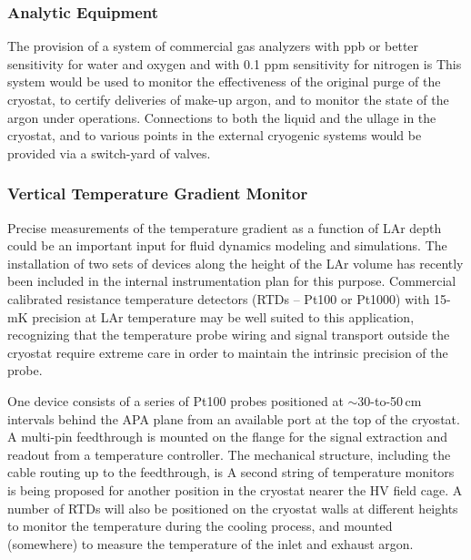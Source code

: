 \subsubsection{Analytic Equipment}

The provision of a system of commercial gas analyzers with ppb or better sensitivity for water and oxygen and with 0.1 ppm sensitivity for nitrogen is This system would be used to monitor the effectiveness of the original purge of the cryostat, to certify deliveries of make-up argon, and to monitor the state of the argon under operations. Connections to both the liquid and the ullage in the cryostat, and to various points in the external cryogenic systems would be provided via a switch-yard of valves. 

\subsubsection{Vertical Temperature Gradient Monitor}

	Precise measurements of the temperature gradient as a function of LAr depth could be
	an important input for fluid dynamics modeling and simulations. The installation of two sets of devices along the  height of the LAr volume 
	has recently  been included in the internal instrumentation plan  for this purpose.
	Commercial calibrated resistance temperature detectors (RTDs -- Pt100 or Pt1000) with 15-mK precision at LAr temperature may be well suited to this application, recognizing that the temperature probe wiring and signal transport outside the cryostat require extreme care in order to maintain  the intrinsic precision of the probe.
	
One device consists of a series of Pt100 probes positioned at $\sim$30-to-50\,cm intervals %
behind the APA plane from %
an available port %
at the top of the cryostat. A multi-pin feedthrough is mounted on the flange %
for the signal extraction and readout from a temperature controller.  
The mechanical structure, including the cable routing up to the feedthrough, is  A second string of temperature monitors is being proposed for another position in the cryostat nearer the HV field cage. 
A number of RTDs will also be positioned on the cryostat walls at different heights to monitor the temperature %
during the cooling process, and mounted (somewhere) to measure the temperature of the inlet and exhaust argon. 

